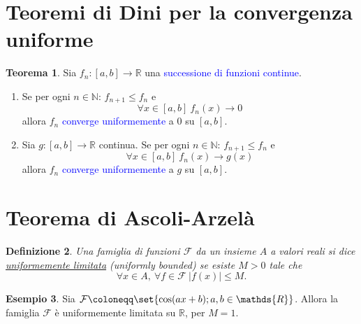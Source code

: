 \documentclass[10pt]{book}
\newcommand{\1}{\mathds{1}}
\newcommand{\R}{\mathds{R}}
\newcommand{\N}{\mathds{N}}
\theoremstyle{definition}%
\newtheorem{thm}{Teorema}[section]
\newtheorem{esempio}[thm]{Esempio}
\theoremstyle{plain}
\newtheorem{definizione}[thm]{Definizione}
\theoremstyle{remark}
\renewcommand{\href}[2]{\textcolor{blue}{#2}}
\begin{document}
\section{Teoremi di Dini per la convergenza uniforme}
\label{sec:org246f630}
\begin{thm}
Sia \(f_{n}:[a,b]\to \R\) una \href{../../../../../org/roam/20250629105815-successione_di_funzioni.org}{successione di funzioni} \href{../../../../../org/roam/20250103103252-funzione_continua.org}{continue}.
\begin{enumerate}
\item Se per ogni \(n \in \N\): \(f_{n+1}\le f_{n}\) e
\begin{equation*}
 \forall x \in [a,b]\ f_{n}(x)\to 0
\end{equation*}
allora \(f_{n}\) \href{../../../../../org/roam/20250629105745-convergenza_uniforme.org}{converge uniformemente} a \(0\) su \([a,b]\).
\item Sia \(g:[a,b]\to \R\) continua. Se per ogni \(n \in \N\): \(f_{n+1}\le f_{n}\) e
\begin{equation*}
 \forall x \in [a,b]\ f_{n}(x)\to g(x)
\end{equation*}
allora \(f_{n}\) \href{../../../../../org/roam/20250629105745-convergenza_uniforme.org}{converge uniformemente} a \(g\) su \([a,b]\).
\end{enumerate}
\end{thm}
\section{Teorema di Ascoli-Arzelà}
\label{sec:org7dfbcaf}

\begin{definizione}
Una famiglia di funzioni \(\mathcal{F}\) da un insieme \(A\) a valori reali si dice \uline{uniformemente limitata} (\emph{uniformly bounded}) se esiste \(M > 0\) tale che
\begin{equation*}
\forall x \in A,\ \forall f \in \mathcal{F}\ |f(x)|\le M.
\end{equation*}
\end{definizione}

\begin{esempio}
Sia \(\mathcal{F} \coloneqq \set{\cos(ax+b); a,b \in \R}\). Allora la famiglia \(\mathcal{F}\) è uniformemente limitata su \(\R\), per \(M=1\).
\end{esempio}
\end{document}
